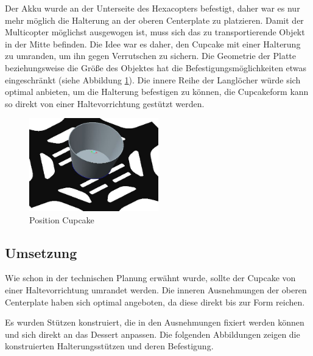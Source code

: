 		Der Akku wurde an der Unterseite des Hexacopters befestigt, daher war es nur mehr möglich die Halterung an der oberen Centerplate zu platzieren.
		Damit der Multicopter möglichst ausgewogen ist, muss sich das zu transportierende Objekt in der Mitte befinden.
		Die Idee war es daher, den Cupcake mit einer Halterung zu umranden, um ihn gegen Verrutschen zu sichern. Die Geometrie der Platte beziehungsweise die Größe des Objektes hat die Befestigungsmöglichkeiten etwas eingeschränkt (siehe Abbildung \ref{platte_cupcake}).
		Die innere Reihe der Langlöcher würde sich optimal anbieten, um die Halterung befestigen zu können, die Cupcakeform kann so direkt von einer Haltevorrichtung gestützt werden.


			\begin{figure}[tbh]
			\begin{centering}
			\includegraphics[width = 0.5\textwidth]{Bilder/platte_cupcake}
			\par\end{centering}
			\caption{Position Cupcake}
			\label{platte_cupcake}
			\end{figure}

	\subsection{Umsetzung}

	Wie schon in der technischen Planung erwähnt wurde, sollte der Cupcake von einer Haltevorrichtung umrandet werden.
	Die inneren Ausnehmungen der oberen Centerplate haben sich optimal angeboten, da diese direkt bis zur Form reichen.

	Es wurden Stützen konstruiert, die in den Ausnehmungen fixiert werden können und sich direkt an das Dessert anpassen.
	Die folgenden Abbildungen zeigen die konstruierten Halterungsstützen und deren Befestigung.

